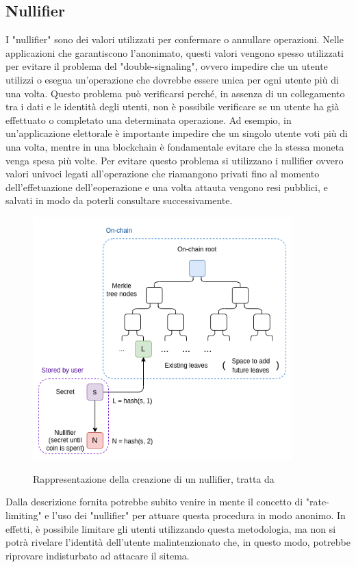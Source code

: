 \subsection{Nullifier}
I "nullifier" sono dei valori utilizzati per confermare o annullare operazioni. Nelle applicazioni che garantiscono l'anonimato, questi valori vengono spesso utilizzati per evitare il problema del "double-signaling", ovvero impedire che un utente utilizzi o esegua un'operazione che dovrebbe essere unica per ogni utente più di una volta. Questo problema può verificarsi perché, in assenza di un collegamento tra i dati e le identità degli utenti, non è possibile verificare se un utente ha già effettuato o completato una determinata operazione. Ad esempio, in un'applicazione elettorale è importante impedire che un singolo utente voti più di una volta, mentre in una blockchain è fondamentale evitare che la stessa moneta venga spesa più volte. Per evitare questo problema si utilizzano i nullifier ovvero valori univoci legati all'operazione che riamangono privati fino al momento dell'effetuazione dell'eoperazione e una volta attauta vengono resi pubblici, e salvati in modo da poterli consultare successivamente.
\begin{figure}[H]
    \centering
    \includegraphics[width=10cm]{./chapters/2.rln-protocol/images/4.nullifier.png}
    \label{fig:nullifier}
    \captionsetup{justification=centering}
    \caption{Rappresentazione della creazione di un nullifier, tratta da \cite{some-ways-to-use-zk-snarks-for-privacy}}
\end{figure}
Dalla descrizione fornita potrebbe subito venire in mente il concetto di "rate-limiting" e l'uso dei "nullifier" per attuare questa procedura in modo anonimo. In effetti, è possibile limitare gli utenti utilizzando questa metodologia, ma non si potrà rivelare l'identità dell'utente malintenzionato che, in questo modo, potrebbe riprovare indisturbato ad attacare il sitema.